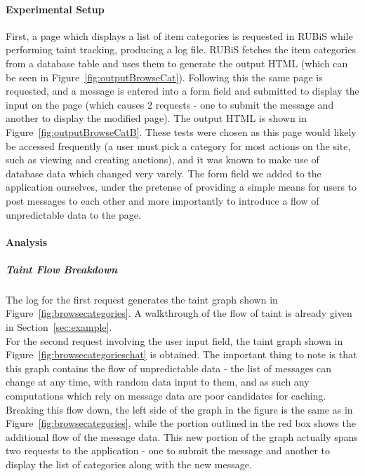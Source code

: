 \documentclass[msc,oneside]{ubcthesis}
\begin{document}
\paragraph{Experimental Setup}
\label{sec:rubisprecompsetup}
First, a page which displays a list of item categories is requested in RUBiS while performing taint tracking, producing a log file. RUBiS fetches the item categories from a database table and uses them to generate the output HTML (which can be seen in Figure~\ref{fig:outputBrowseCat}). Following this the same page is requested, and a message is entered into a form field and submitted to display the input on the page (which causes 2 requests - one to submit the message and another to display the modified page). The output HTML is shown in Figure~\ref{fig:outputBrowseCatB}. These tests were chosen as this page would likely be accessed frequently (a user must pick a category for most actions on the site, such as viewing and creating auctions), and it was known to make use of database data which changed very varely. The form field we added to the application ourselves, under the pretense of providing a simple means for users to post messages to each other and more importantly to introduce a flow of unpredictable data to the page.

\paragraph{Analysis}
\subparagraph{Taint Flow Breakdown}
\label{sec:rubisprecompflow}
The log for the first request generates the taint graph shown in Figure~\ref{fig:browsecategories}. A walkthrough of the flow of taint is already given in Section~\ref{sec:example}.\\

For the second request involving the user input field, the taint graph shown in Figure~\ref{fig:browsecategorieschat} is obtained. The important thing to note is that this graph contains the flow of unpredictable data - the list of messages can change at any time, with random data input to them, and as such any computations which rely on message data are poor candidates for caching.\\

Breaking this flow down, the left side of the graph in the figure is the same as in Figure~\ref{fig:browsecategories}, while the portion outlined in the red box shows the additional flow of the message data. This new portion of the graph actually spans two requests to the application - one to submit the  message and another to display the list of categories along with the new message.
\end{document}

